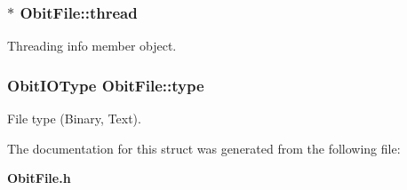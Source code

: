 \subsubsection{$\ast$ {\bf Obit\-File::thread}}\label{structObitFile_o4}


Threading info member object. 

\subsubsection{\setlength{\rightskip}{0pt plus 5cm}Obit\-IOType {\bf Obit\-File::type}}\label{structObitFile_o6}


File type (Binary, Text). 



The documentation for this struct was generated from the following file:\begin{CompactItemize}
\item 
{\bf Obit\-File.h}\end{CompactItemize}
